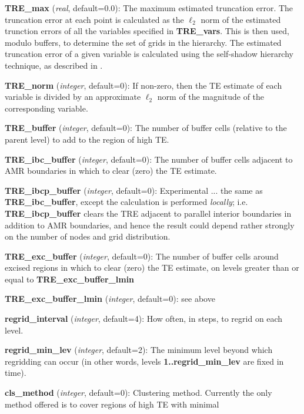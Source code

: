 \documentclass[aps,amssymb,unsortedaddress,nofootinbib]{revtex4}
\def\lsep{\itemsep 0.05in}
\begin{document}
\begin{list}{}{\lsep}
\item {\bf TRE\_max} ({\em real}, default=0.0): The maximum estimated truncation
      error. The truncation error at each point is calculated as the $\ell_2$ norm 
      of the estimated trunction errors of all the variables specified in {\bf TRE\_vars}.
      This is then used, modulo buffers, to determine the set of grids in the
      hierarchy.
      The estimated truncation error of a given variable is calculated
      using the self-shadow hierarchy technique, as described in \cite{fpthesis}.
\item {\bf TRE\_norm} ({\em integer}, default=0): If non-zero, then the 
      TE estimate of each variable is divided by an approximate $\ell_2$ norm
      of the magnitude of the corresponding variable.
\item {\bf TRE\_buffer} ({\em integer}, default=0): The number of buffer cells
      (relative to the parent level) to add to the region of high TE.
\item {\bf TRE\_ibc\_buffer} ({\em integer}, default=0):
      The number of buffer cells adjacent to AMR boundaries in which to
      clear (zero) the TE estimate.
\item {\bf TRE\_ibcp\_buffer} ({\em integer}, default=0):
      Experimental ... the same as {\bf TRE\_ibc\_buffer}, except the calculation is
      performed {\em locally}; i.e. {\bf TRE\_ibcp\_buffer} clears the
      TRE adjacent to parallel interior boundaries in addition to AMR boundaries,
      and hence the result could depend rather strongly on the number of nodes
      and grid distribution.
\item {\bf TRE\_exc\_buffer} ({\em integer}, default=0):
      The number of buffer cells around excised regions in which to
      clear (zero) the TE estimate, on levels greater than or equal to
      {\bf TRE\_exc\_buffer\_lmin}
\item {\bf TRE\_exc\_buffer\_lmin} ({\em integer}, default=0): see above
\item {\bf regrid\_interval} ({\em integer}, default=4): How often, in steps,
      to regrid on each level.
\item {\bf regrid\_min\_lev} ({\em integer}, default=2): The minimum level beyond which
      regridding can occur (in other words, levels {\bf 1..regrid\_min\_lev} are
      fixed in time).
\item {\bf cls\_method} ({\em integer}, default=0): Clustering method. Currently
      the only method offered is to cover regions of high TE with minimal

\end{list}
\end{document}

